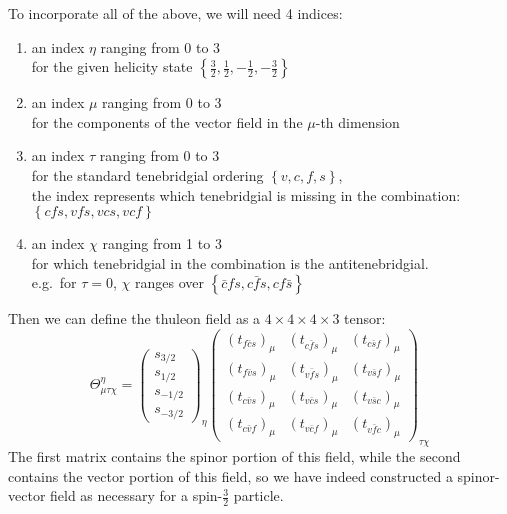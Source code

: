 \begin{definition}
  To incorporate all of the above, we will need 4 indices:
  \begin{enumerate}
    \item an index \(\eta\) ranging from 0 to 3\\
          for the given helicity state \(\left\{\frac{3}{2},\frac{1}{2},-\frac{1}{2},-\frac{3}{2}\right\}\)
    \item an index \(\mu\) ranging from 0 to 3\\
          for the components of the vector field in the \(\mu\)-th dimension
    \item an index \(\tau\) ranging from 0 to 3\\
          for the standard tenebridgial ordering \(\left\{v,c,f,s\right\}\),\\
          the index represents which tenebridgial is missing in the combination:
          \(\left\{cfs,vfs,vcs,vcf\right\}\)
    \item an index \(\chi\) ranging from 1 to 3\\
          for which tenebridgial in the combination is the antitenebridgial.\\
          e.g.\ for \(\tau=0\), \(\chi\) ranges over \(\left\{\bar{c}fs,c\bar{f}s,cf\bar{s}\right\}\)
  \end{enumerate}
  Then we can define the thuleon field as a \(4\times4\times4\times3\) tensor:
  \begin{equation}
    \Theta^{\eta}_{\mu \tau \chi}
    =
    \begin{pmatrix}s_{3/2}\\s_{1/2}\\s_{-1/2}\\s_{-3/2}\end{pmatrix}_{\eta}
    \begin{pmatrix}
      \left(t_{f \bar{c} s}\right)_{\mu} & \left(t_{c \bar{f} s}\right)_{\mu} & \left(t_{c \bar{s} f}\right)_{\mu} \\
      \left(t_{f \bar{v} s}\right)_{\mu} & \left(t_{v \bar{f} s}\right)_{\mu} & \left(t_{v \bar{s} f}\right)_{\mu} \\
      \left(t_{c \bar{v} s}\right)_{\mu} & \left(t_{v \bar{c} s}\right)_{\mu} & \left(t_{v \bar{s} c}\right)_{\mu} \\
      \left(t_{c \bar{v} f}\right)_{\mu} & \left(t_{v \bar{c} f}\right)_{\mu} & \left(t_{v \bar{f} c}\right)_{\mu}
    \end{pmatrix}_{\tau \chi}
  \end{equation}
  The first matrix contains the spinor portion of this field, while the second contains the vector portion of this field, so we have indeed constructed a spinor-vector field as necessary for a spin-\(\frac{3}{2}\) particle.
\end{definition}

